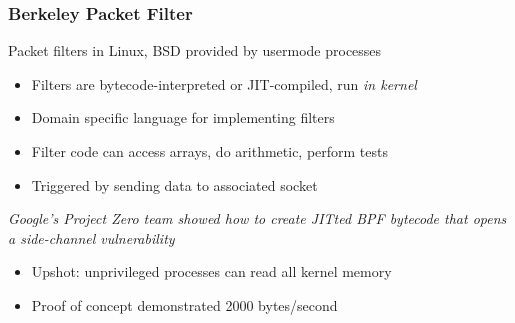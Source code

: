 \documentclass[10pt,handout]{beamer}
\begin{document}
\begin{frame}

\frametitle{Berkeley Packet Filter}

Packet filters in Linux, BSD provided by usermode processes \pause
\begin{itemize}
  \item Filters are bytecode-interpreted or JIT-compiled, run \emph{in kernel}
  \item Domain specific language for implementing filters
  \item Filter code can access arrays, do arithmetic, perform tests
  \item Triggered by sending data to associated socket \\[1em]
\end{itemize}

\pause
\begin{center}
\emph{Google's Project Zero team showed how to create JITted BPF bytecode that opens a side-channel vulnerability}
\end{center}
\pause
\begin{itemize}
  \item Upshot: unprivileged processes can read all kernel memory
  \item Proof of concept demonstrated 2000 bytes/second
\end{itemize}

\end{frame}

\end{document}
